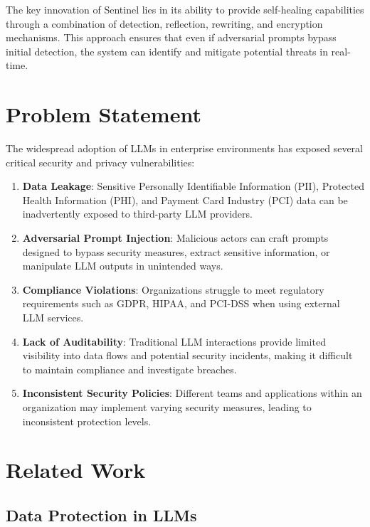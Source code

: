 \documentclass[12pt]{article}
\begin{document}
The key innovation of Sentinel lies in its ability to provide self-healing capabilities through a combination of detection, reflection, rewriting, and encryption mechanisms. This approach ensures that even if adversarial prompts bypass initial detection, the system can identify and mitigate potential threats in real-time.

\section{Problem Statement}

The widespread adoption of LLMs in enterprise environments has exposed several critical security and privacy vulnerabilities:

\begin{enumerate}
    \item \textbf{Data Leakage}: Sensitive Personally Identifiable Information (PII), Protected Health Information (PHI), and Payment Card Industry (PCI) data can be inadvertently exposed to third-party LLM providers.
    
    \item \textbf{Adversarial Prompt Injection}: Malicious actors can craft prompts designed to bypass security measures, extract sensitive information, or manipulate LLM outputs in unintended ways.
    
    \item \textbf{Compliance Violations}: Organizations struggle to meet regulatory requirements such as GDPR, HIPAA, and PCI-DSS when using external LLM services.
    
    \item \textbf{Lack of Auditability}: Traditional LLM interactions provide limited visibility into data flows and potential security incidents, making it difficult to maintain compliance and investigate breaches.
    
    \item \textbf{Inconsistent Security Policies}: Different teams and applications within an organization may implement varying security measures, leading to inconsistent protection levels.
\end{enumerate}

\section{Related Work}

\subsection{Data Protection in LLMs}
\end{document}
